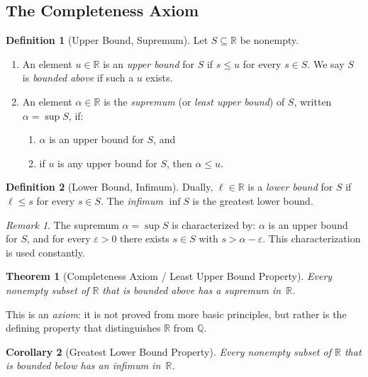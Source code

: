 \documentclass[11pt,a4paper]{article}
\theoremstyle{definition}
\newtheorem{definition}{Definition}[section]
\theoremstyle{plain}
\newtheorem{theorem}{Theorem}[section]
\newtheorem{corollary}[theorem]{Corollary}
\theoremstyle{remark}
\newtheorem{remark}{Remark}[section]
\newcommand{\R}{\mathbb{R}}
\newcommand{\Q}{\mathbb{Q}}
\begin{document}
\subsection{The Completeness Axiom}
\label{subsec:completeness}

\begin{definition}[Upper Bound, Supremum]
\label{def:supremum}
Let $S \subseteq \R$ be nonempty.
\begin{enumerate}[nosep,label=(\roman*)]
    \item An element $u \in \R$ is an \emph{upper bound} for $S$ if $s \le u$
    for every $s \in S$. We say $S$ is \emph{bounded above} if such a $u$ exists.
    \item An element $\alpha \in \R$ is the \emph{supremum} (or \emph{least upper
    bound}) of $S$, written $\alpha = \sup S$, if:
    \begin{enumerate}[nosep,label=(\alph*)]
        \item $\alpha$ is an upper bound for $S$, and
        \item if $u$ is any upper bound for $S$, then $\alpha \le u$.
    \end{enumerate}
\end{enumerate}
\end{definition}

\begin{definition}[Lower Bound, Infimum]
\label{def:infimum}
Dually, $\ell \in \R$ is a \emph{lower bound} for $S$ if $\ell \le s$ for every
$s \in S$. The \emph{infimum} $\inf S$ is the greatest lower bound.
\end{definition}

\begin{remark}
\label{rem:sup_characterization}
The supremum $\alpha = \sup S$ is characterized by: $\alpha$ is an upper bound
for $S$, and for every $\varepsilon > 0$ there exists $s \in S$ with
$s > \alpha - \varepsilon$. This characterization is used constantly.
\end{remark}

\begin{theorem}[Completeness Axiom / Least Upper Bound Property]
\label{thm:completeness}
Every nonempty subset of\/ $\R$ that is bounded above has a supremum in~$\R$.
\end{theorem}

This is an \emph{axiom}: it is not proved from more basic principles, but rather
is the defining property that distinguishes $\R$ from $\Q$.

\begin{corollary}[Greatest Lower Bound Property]
\label{cor:glb}
Every nonempty subset of\/ $\R$ that is bounded below has an infimum in~$\R$.
\end{corollary}
\end{document}
